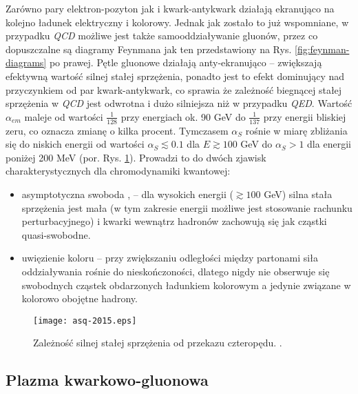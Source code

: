 Zarówno pary elektron-pozyton jak i kwark-antykwark działają ekranująco na kolejno ładunek elektryczny i kolorowy. Jednak jak zostało to już wspomniane, w przypadku \textit{QCD} możliwe jest także samooddziaływanie gluonów, przez co dopuszczalne są diagramy Feynmana jak ten przedstawiony na Rys. \ref{fig:feynman-diagrams} po prawej. Pętle gluonowe działają anty-ekranująco -- zwiększają efektywną wartość silnej stałej sprzężenia, ponadto jest to efekt dominujący nad przyczynkiem od par kwark-antykwark, co sprawia że zależność biegnącej stałej sprzężenia w \textit{QCD} jest odwrotna i dużo silniejsza niż w przypadku \textit{QED}. Wartość $\alpha_{em}$ maleje od wartości $\frac{1}{128}$ przy energiach ok. 90 GeV do $\frac{1}{137}$ przy energii bliskiej zeru, co oznacza zmianę o kilka procent. 
Tymczasem $\alpha_S$ rośnie w miarę zbliżania się do niskich energii od wartości $\alpha_S\lesssim 0.1$ dla $E \gtrsim 100$ GeV do $\alpha_S > 1$ dla energii poniżej 200 MeV (por. Rys. \ref{fig:running-coupling-const}). Prowadzi to do dwóch zjawisk charakterystycznych dla chromodynamiki kwantowej: 
\begin{itemize}
	\item asymptotyczna swoboda  \cite{Gross:1973id}, \cite{Politzer:1973fx} -- dla wysokich energii ($\gtrsim 100$ GeV) silna stała sprzężenia jest mała (w tym zakresie energii możliwe jest stosowanie rachunku perturbacyjnego) i kwarki wewnątrz hadronów zachowują się jak cząstki quasi-swobodne.
	\item uwięzienie koloru  -- przy zwiększaniu odległości między partonami siła oddziaływania rośnie do nieskończoności, dlatego nigdy nie obserwuje się swobodnych cząstek obdarzonych ładunkiem kolorowym a jedynie związane w kolorowo obojętne hadrony.
\end{itemize}


\begin{figure}[h]
	\centering
	\texttt{[image: asq-2015.eps]}
	\caption{Zależność silnej stałej sprzężenia od przekazu czteropędu. .}
	\label{fig:running-coupling-const}
\end{figure}


\subsection{Plazma kwarkowo-gluonowa}
\label{subsec:qgp}

